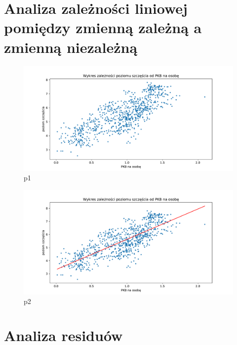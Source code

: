 \documentclass{article}
\theoremstyle{break}
\begin{document}
\section{Analiza zależności liniowej pomiędzy zmienną zależną a zmienną niezależną}

\begin{figure}[H]
	\begin{center}
		\includegraphics[scale=0.43]{plot1.pdf}
		\caption{p1}
		\label{fig:plot1}
	\end{center}
\end{figure}

\begin{figure}[H]
	\begin{center}
		\includegraphics[scale=0.43]{plot2.pdf}
		\caption{p2}
		\label{fig:plot2}
	\end{center}
\end{figure}
	
\section{Analiza residuów}
\end{document}
